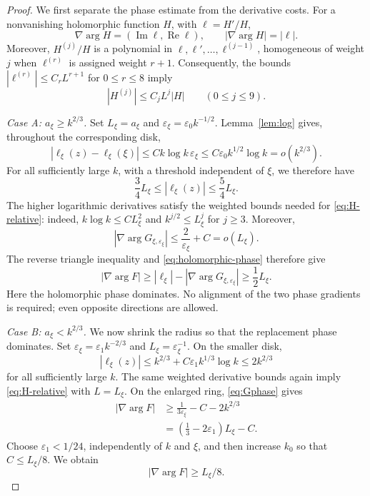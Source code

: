 \documentclass[11pt,a4paper,leqno]{amsart}
\numberwithin{equation}{section}
\theoremstyle{landisplain}
\theoremstyle{landisdefinition}
\theoremstyle{landisremark}
\newcommand{\eps}{\varepsilon}
\newcommand{\Rea}{\operatorname{Re}}
\newcommand{\Ima}{\operatorname{Im}}
\begin{document}
\begin{proof}
We first separate the phase estimate from the derivative costs.
For a nonvanishing holomorphic function $H$, with $\ell=H'/H$,
\begin{equation}\label{eq:holomorphic-phase}
 \nabla\arg H=(\Ima\ell,\Rea\ell),\qquad
 |\nabla\arg H|=|\ell|.
\end{equation}
Moreover, $H^{(j)}/H$ is a polynomial in
$\ell,\ell',\ldots,\ell^{(j-1)}$, homogeneous of weight $j$
when $\ell^{(r)}$ is assigned weight $r+1$. Consequently, the
bounds $|\ell^{(r)}|\le C_rL^{r+1}$ for $0\le r\le8$
imply
\begin{equation}\label{eq:H-relative}
 |H^{(j)}|\le C_jL^j|H|\qquad(0\le j\le9).
\end{equation}

\smallskip\noindent\emph{Case A: $a_\xi\ge k^{2/3}$.}
Set $L_\xi=a_\xi$ and $\eps_\xi=\eps_0k^{-1/2}$.
Lemma~\ref{lem:log} gives, throughout the corresponding disk,
\[
 |\ell_\xi(z)-\ell_\xi(\xi)|
 \le Ck\log k\,\eps_\xi
 \le C\eps_0k^{1/2}\log k=o(k^{2/3}).
\]
For all sufficiently large $k$, with a threshold independent
of $\xi$, we therefore have
\[
 \frac34L_\xi\le|\ell_\xi(z)|\le\frac54L_\xi.
\]
The higher logarithmic derivatives satisfy the weighted bounds needed
for \eqref{eq:H-relative}: indeed,
$k\log k\le CL_\xi^2$ and $k^{j/2}\le L_\xi^j$ for $j\ge3$.
Moreover,
\[
 |\nabla\arg G_{\xi,\eps_\xi}|
 \le\frac2{\eps_\xi}+C=o(L_\xi).
\]
The reverse triangle inequality and \eqref{eq:holomorphic-phase}
therefore give
\begin{equation}\label{eq:phase-A}
 |\nabla\arg F|
 \ge|\ell_\xi|-|\nabla\arg G_{\xi,\eps_\xi}|
 \ge\frac12L_\xi.
\end{equation}
Here the holomorphic phase dominates. No alignment of the two
phase gradients is required; even opposite directions are allowed.

\smallskip\noindent\emph{Case B: $a_\xi<k^{2/3}$.}
We now shrink the radius so that the replacement phase dominates.
Set $\eps_\xi=\eps_1k^{-2/3}$ and
$L_\xi=\eps_\xi^{-1}$. On the smaller disk,
\[
 |\ell_\xi(z)|
 \le k^{2/3}+C\eps_1k^{1/3}\log k\le2k^{2/3}
\]
for all sufficiently large $k$. The same weighted derivative
bounds again imply \eqref{eq:H-relative} with $L=L_\xi$.
On the enlarged ring, \eqref{eq:Gphase} gives
\begin{align*}
 |\nabla\arg F|
 &\ge\frac1{3\eps_\xi}-C-2k^{2/3}\\
 &=\left(\frac13-2\eps_1\right)L_\xi-C.
\end{align*}
Choose $\eps_1<1/24$, independently of $k$ and $\xi$, and then
increase $k_0$ so that $C\le L_\xi/8$. We obtain
\begin{equation}\label{eq:phase-B}
 |\nabla\arg F|\ge L_\xi/8.
\end{equation}


\end{proof}
\end{document}
